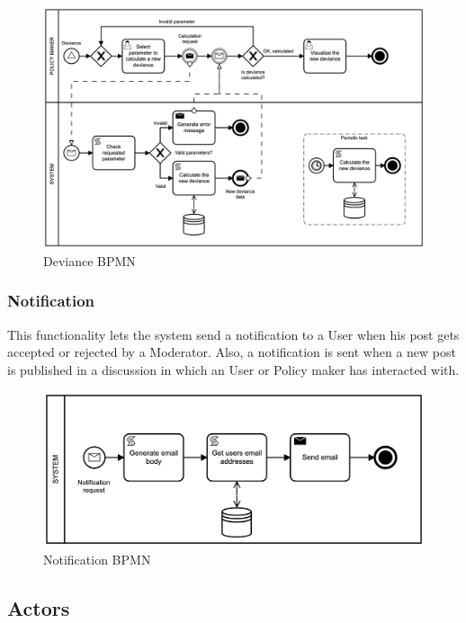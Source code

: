 \begin{figure}[h!]
    \centering
    \includegraphics[scale=0.14]{images/bpmn/deviance_bpmn.png}
    \caption{Deviance BPMN}
    \label{fig:bpmn_deviance}
\end{figure}
\FloatBarrier

\subsubsection{Notification}
This functionality lets the system send a notification to a User when his post gets accepted or rejected by a Moderator. Also, a notification is sent when a new post is published in a discussion in which an User or Policy maker has interacted with.

\begin{figure}[h!]
    \centering
    \includegraphics[scale=0.18]{images/bpmn/notification_bpmn.png}
    \caption{Notification BPMN}
    \label{fig:bpmn_notification}
\end{figure}
\FloatBarrier

\subsection{Actors}
